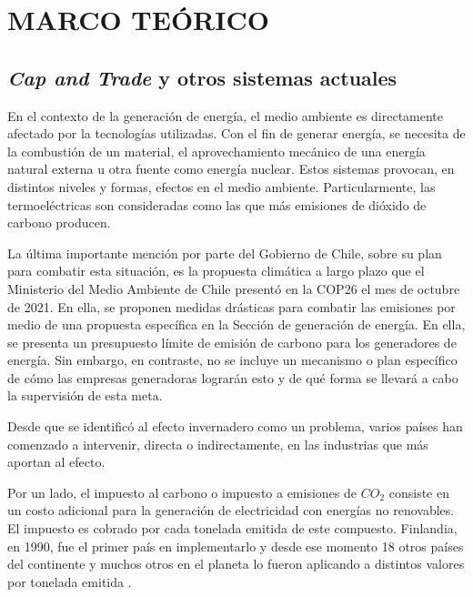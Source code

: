 
\chapter{MARCO TEÓRICO}
\label{c2} 


\section{\textit{Cap and Trade} y otros sistemas actuales}\label{c22}

En el contexto de la generación de energía, el medio ambiente es directamente afectado por la tecnologías utilizadas. Con el fin de generar energía, se necesita de la combustión de un material, el aprovechamiento mecánico de una energía natural externa u otra fuente como energía nuclear. Estos sistemas provocan, en distintos niveles y formas, efectos en el medio ambiente. Particularmente, las termoeléctricas son consideradas como las que más emisiones de dióxido de carbono producen.
\vspace{2.5mm}

La última importante mención por parte del Gobierno de Chile, sobre su plan para combatir esta situación, es la propuesta climática a largo plazo que el Ministerio del Medio Ambiente de Chile presentó en la COP26 el mes de octubre de 2021. En ella, se proponen medidas drásticas para combatir las emisiones por medio de una propuesta específica en la Sección de generación de energía. En ella, se presenta un presupuesto límite de emisión de carbono para los generadores de energía. Sin  embargo, en contraste, no se incluye un mecanismo o plan específico de cómo las empresas generadoras lograrán esto y de qué forma se llevará a cabo la supervisión de esta meta.
\vspace{2.5mm}

Desde que se identificó al efecto invernadero como un problema, varios países han comenzado a intervenir, directa o indirectamente, en las industrias que más aportan al efecto. 
\vspace{2.5mm}

Por un lado, el impuesto al carbono o impuesto a emisiones de $CO_2$ consiste en un costo adicional para la generación de electricidad con energías no renovables. El impuesto es cobrado por cada tonelada emitida de este compuesto. Finlandia, en 1990, fue el primer país en implementarlo y desde ese momento 18 otros países del continente y muchos otros en el planeta lo fueron aplicando a distintos valores por tonelada emitida .
\vspace{2.5mm}

